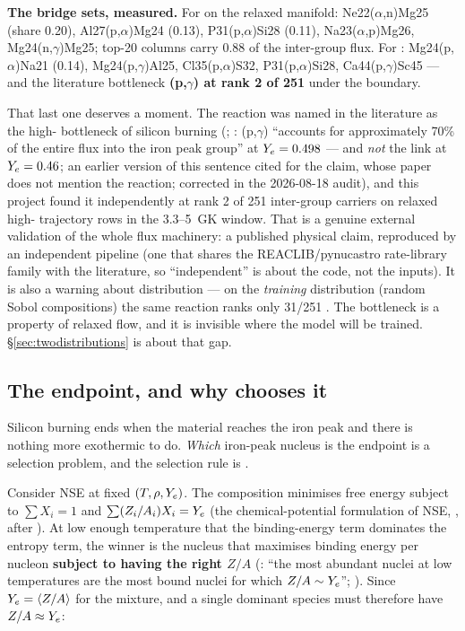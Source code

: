 \textbf{The bridge sets, measured.} For  on the relaxed manifold:
Ne22($\alpha$,n)Mg25 (share 0.20), Al27(p,$\alpha$)Mg24 (0.13),
P31(p,$\alpha$)Si28 (0.11), Na23($\alpha$,p)Mg26, Mg24(n,$\gamma$)Mg25; top-20
columns carry 0.88 of the inter-group flux. For : Mg24(p,$\alpha$)Na21
(0.14), Mg24(p,$\gamma$)Al25, Cl35(p,$\alpha$)S32, P31(p,$\alpha$)Si28,
Ca44(p,$\gamma$)Sc45 --- and the literature bottleneck
\textbf{(p,$\gamma$) at rank 2 of 251} under the
 boundary. 

That last one deserves a moment. The reaction was named in the literature as
the high-\Ye{} bottleneck of silicon burning (\citealt[\S VIb]{woosley1973};
\citealt[\S 6.2]{hix1996}: (p,$\gamma$) ``accounts for
approximately 70\% of the entire flux into the iron peak group'' at
$Y_{e} = 0.498$ --- and \emph{not} the link at $Y_{e} = 0.46$; an earlier version of
this sentence cited \citet{grichener2025} for the claim, whose paper does not
mention the reaction; corrected in the 2026-08-18 audit), and this project
found it independently at rank 2 of 251 inter-group carriers on relaxed
high-\Ye{} trajectory rows in the 3.3--5~GK window. That is a genuine external
validation of the whole flux machinery: a published physical claim, reproduced
by an independent pipeline (one that shares the REACLIB/pynucastro rate-library
family with the literature, so ``independent'' is about the code, not the
inputs). It is also a warning about distribution --- on the \emph{training}
distribution (random Sobol compositions) the same reaction ranks only 31/251
. The bottleneck is a property of relaxed flow, and it
is invisible where the model will be trained. \S\ref{sec:twodistributions} is
about that gap.

\subsection{The endpoint, and why \texorpdfstring{\Ye}{Ye} chooses it}
\label{sec:endpoint}

Silicon burning ends when the material reaches the iron peak and there is
nothing more exothermic to do. \emph{Which} iron-peak nucleus is the endpoint
is a selection problem, and the selection rule is \Ye.

Consider NSE at fixed $(T, \rho, Y_{e})$. The composition minimises free energy
subject to $\sum X_i = 1$ and $\sum (Z_i/A_i)X_i = Y_{e}$ (the chemical-potential
formulation of NSE, \citealt[\S 5]{hix1999b}, after \citealt{clifford1965}). At
low enough temperature that the binding-energy term dominates the entropy term,
the winner is the nucleus that maximises binding energy per nucleon
\textbf{subject to having the right $Z/A$} (\citealt{hix1999b}: ``the most
abundant nuclei at low temperatures are the most bound nuclei for which
$Z/A \sim Y_{e}$''; \citealt[Fig.~2]{hartmann1985}). Since $Y_{e} = \langle Z/A
\rangle$ for the mixture, and a single dominant species must therefore have
$Z/A \approx Y_{e}$:

